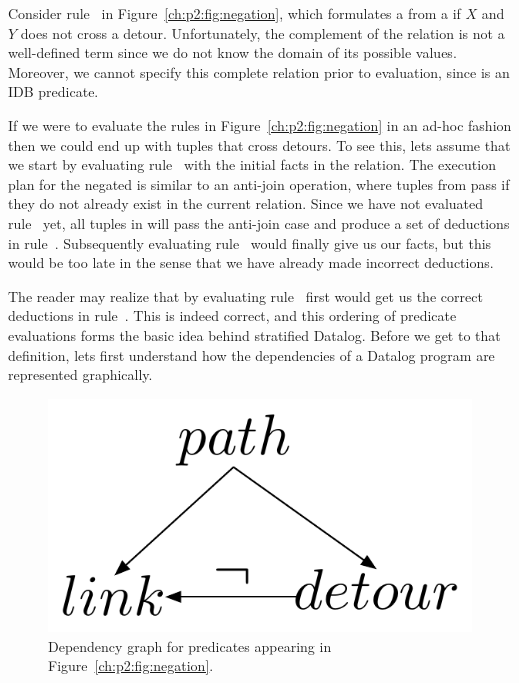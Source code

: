 Consider rule~ in Figure~\ref{ch:p2:fig:negation}, which formulates a
 from a  if $X$ and $Y$ does not cross a detour.
Unfortunately, the complement of the  relation is not a well-defined
term since we do not know the domain of its possible values.  Moreover, we cannot
specify this complete relation prior to evaluation, since 
is an IDB predicate.

If we were to evaluate the rules in Figure~\ref{ch:p2:fig:negation} in an
ad-hoc fashion then we could end up with  tuples that cross detours.
To see this, lets assume that we start by evaluating rule~ with the
initial facts in the  relation.  The execution plan for the negated
 is similar to an anti-join operation, where tuples from 
pass if they do not already exist in the current  relation.  Since
we have not evaluated rule~ yet, all tuples in  will pass the
anti-join case and produce a set of  deductions in rule~.
Subsequently evaluating rule~ would finally give us our 
facts, but this would be too late in the sense that we have already made
incorrect deductions.

The reader may realize that by evaluating rule~ first would get us the
correct deductions in rule~.  This is indeed correct, and this ordering
of predicate evaluations forms the basic idea behind stratified Datalog.
Before we get to that definition, lets first understand how the dependencies of
a Datalog program are represented graphically.

\begin{figure} 
\ssp
\begin{center}
\includegraphics[scale=1]{figures/dependency-graph}
\caption{\label{ch:p2:fig:dependency}Dependency graph for predicates 
appearing in Figure~\ref{ch:p2:fig:negation}.}
\end{center} 
\end{figure}

